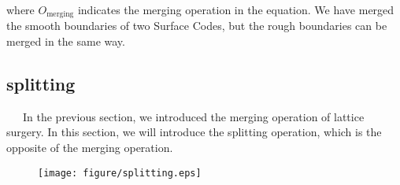 \documentclass[a4paper,11pt]{ltjsarticle}
\begin{document}
{    where $O_{\text{merging}}$ indicates the merging operation in the equation. We have merged the smooth boundaries of two Surface Codes, but the rough boundaries can be merged in the same way.

    \subsection{splitting}{
        \ \ \ In the previous section, we introduced the merging operation of lattice surgery. In this section, we will introduce the splitting operation, which is the opposite of the merging operation.

        \begin{figure}[h]
            \centering
            \texttt{[image: figure/splitting.eps]}
            \vspace{0pt}\caption{}
            \label{splitting}
            \vspace{-10pt}
        \end{figure}

    }
}
\end{document}
